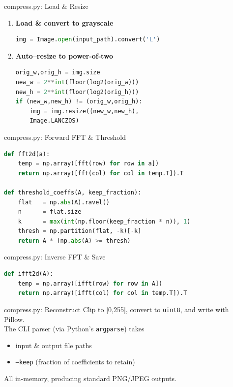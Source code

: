 \documentclass[12pt]{beamer}
\begin{document}
\begin{frame}[fragile]{compress.py: Load \& Resize}
  \begin{enumerate}
    \item \textbf{Load \& convert to grayscale}
\begin{lstlisting}[language=Python]
img = Image.open(input_path).convert('L')
\end{lstlisting}

    \item \textbf{Auto–resize to power‑of‑two}
\begin{lstlisting}[language=Python]
orig_w,orig_h = img.size
new_w = 2**int(floor(log2(orig_w)))
new_h = 2**int(floor(log2(orig_h)))
if (new_w,new_h) != (orig_w,orig_h):
    img = img.resize((new_w,new_h), 
    Image.LANCZOS)
\end{lstlisting}
  \end{enumerate}
  \normalsize
\end{frame}

\begin{frame}[fragile]{compress.py: Forward FFT \& Threshold}
\begin{lstlisting}[language=Python]
def fft2d(a):
    temp = np.array([fft(row) for row in a])
    return np.array([fft(col) for col in temp.T]).T

def threshold_coeffs(A, keep_fraction):
    flat   = np.abs(A).ravel()
    n      = flat.size
    k      = max(int(np.floor(keep_fraction * n)), 1)
    thresh = np.partition(flat, -k)[-k]
    return A * (np.abs(A) >= thresh)
\end{lstlisting}
\end{frame}

\begin{frame}[fragile]{compress.py: Inverse FFT \& Save}
\begin{lstlisting}[language=Python]
def ifft2d(A):
    temp = np.array([ifft(row) for row in A])
    return np.array([ifft(col) for col in temp.T]).T
\end{lstlisting}
\normalsize
\end{frame}



\begin{frame}{compress.py: Reconstruct}
Clip to [0,255], convert to \texttt{uint8}, and write with Pillow.\\[1ex]
The CLI parser (via Python’s \texttt{argparse}) takes
\begin{itemize}
  \item input \& output file paths
  \item \texttt{--keep} (fraction of coefficients to retain)
\end{itemize}
All in‐memory, producing standard PNG/JPEG outputs.
\end{frame}
\end{document}
